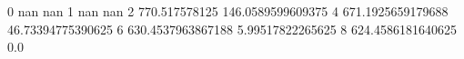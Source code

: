 0 nan nan
1 nan nan
2 770.517578125 146.0589599609375
4 671.1925659179688 46.73394775390625
6 630.4537963867188 5.99517822265625
8 624.4586181640625 0.0
